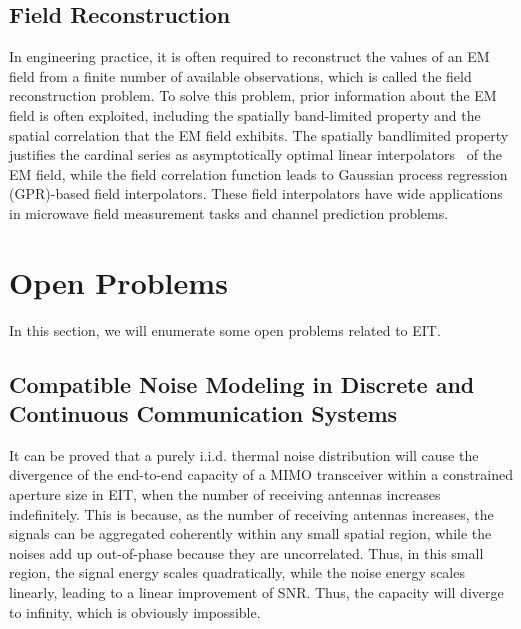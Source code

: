 \documentclass[journal,twocolumn]{IEEEtran}
\begin{document}

\subsection{Field Reconstruction}
In engineering practice, it is often required to reconstruct the values of an EM field from a finite number of available observations, which is called the field reconstruction problem. 
To solve this problem, prior information about the EM field is often exploited, including the spatially band-limited property and the spatial correlation that the EM field exhibits. 
The spatially bandlimited property justifies the cardinal series as asymptotically optimal linear interpolators~\cite{pizzo2022nyquist} of the EM field, while the field correlation function leads to Gaussian process regression (GPR)-based field interpolators. 
These field interpolators have wide applications in microwave field measurement tasks and channel prediction problems. 

\section{Open Problems}
In this section, we will enumerate some open problems related to EIT. 

\subsection{Compatible Noise Modeling in Discrete and Continuous Communication Systems}
It can be proved that a purely i.i.d. thermal noise distribution will cause the divergence of the end-to-end capacity of a MIMO transceiver within a constrained aperture size in EIT, when the number of receiving antennas increases indefinitely. 
This is because, as the number of receiving antennas increases, the signals can be aggregated coherently within any small spatial region, while the noises add up out-of-phase because they are uncorrelated. 
Thus, in this small region, the signal energy scales quadratically, while the noise energy scales linearly, leading to a linear improvement of SNR. Thus, the capacity will diverge to infinity, which is obviously impossible.  
\end{document}

